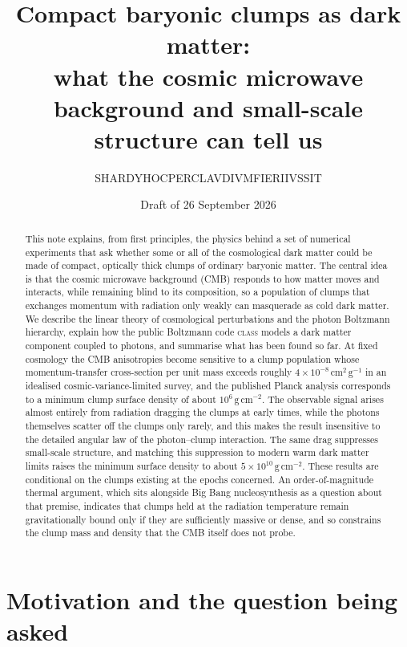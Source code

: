 \documentclass[11pt,a4paper]{article}
\title{Compact baryonic clumps as dark matter:\\
what the cosmic microwave background and small-scale structure can tell us}
\author{S\textperiodcentered HARDY\textperiodcentered HOC\textperiodcentered PER\textperiodcentered CLAVDIVM\textperiodcentered FIERI\textperiodcentered IVSSIT}
\date{Draft of 26 September 2026}
\begin{document}
\maketitle

\begin{abstract}
This note explains, from first principles, the physics behind a set of numerical experiments that ask whether some or all of the cosmological dark matter could be made of compact, optically thick clumps of ordinary baryonic matter. The central idea is that the cosmic microwave background (CMB) responds to how matter moves and interacts, while remaining blind to its composition, so a population of clumps that exchanges momentum with radiation only weakly can masquerade as cold dark matter. We describe the linear theory of cosmological perturbations and the photon Boltzmann hierarchy, explain how the public Boltzmann code \textsc{class} models a dark matter component coupled to photons, and summarise what has been found so far. At fixed cosmology the CMB anisotropies become sensitive to a clump population whose momentum-transfer cross-section per unit mass exceeds roughly $4\times10^{-8}\,\mathrm{cm^2\,g^{-1}}$ in an idealised cosmic-variance-limited survey, and the published Planck analysis corresponds to a minimum clump surface density of about $10^6\,\mathrm{g\,cm^{-2}}$. The observable signal arises almost entirely from radiation dragging the clumps at early times, while the photons themselves scatter off the clumps only rarely, and this makes the result insensitive to the detailed angular law of the photon--clump interaction. The same drag suppresses small-scale structure, and matching this suppression to modern warm dark matter limits raises the minimum surface density to about $5\times10^{10}\,\mathrm{g\,cm^{-2}}$. These results are conditional on the clumps existing at the epochs concerned. An order-of-magnitude thermal argument, which sits alongside Big Bang nucleosynthesis as a question about that premise, indicates that clumps held at the radiation temperature remain gravitationally bound only if they are sufficiently massive or dense, and so constrains the clump mass and density that the CMB itself does not probe.
\end{abstract}

\tableofcontents

\section{Motivation and the question being asked}
\label{sec:motivation}
\end{document}
